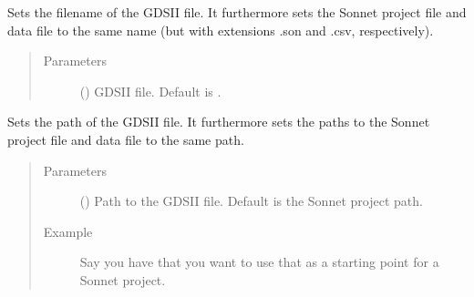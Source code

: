 \documentclass[letterpaper,10pt,english,openany]{sphinxmanual}
\begin{document}
\begin{fulllineitems}
\begin{fulllineitems}
\label{\detokenize{source/sonpy:sonpy.sonnet.setGdsFile}}
Sets the filename of the GDSII file. It furthermore sets the Sonnet project file and data file to the same name (but with extensions .son and .csv, respectively).
\begin{quote}\begin{description}
\item[{Parameters}] \leavevmode
{} () \textendash{} GDSII file. Default is .

\end{description}\end{quote}

\end{fulllineitems}


\begin{fulllineitems}
\label{\detokenize{source/sonpy:sonpy.sonnet.setGdsFilePath}}
Sets the path of the GDSII file. It furthermore sets the paths to the Sonnet project file and data file to the same path.
\begin{quote}\begin{description}
\item[{Parameters}] \leavevmode
{} () \textendash{} Path to the GDSII file. Default is the Sonnet project path.

\item[{Example}] \leavevmode
Say you have  that you want to use that as a starting point for a Sonnet project.

%
\begin{sphinxVerbatim}[commandchars=\\\{\}]
 
 
\end{sphinxVerbatim}


\end{description}
\end{quote}
\end{fulllineitems}
\end{fulllineitems}
\end{document}
